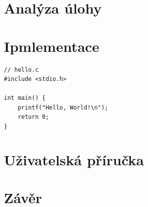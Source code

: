 \documentclass[12pt, a4paper]{article}
\begin{document}
\section{Analýza úlohy}


\section{Ipmlementace}

\begin{lstlisting}
// hello.c
#include <stdio.h>

int main() {
    printf("Hello, World!\n");
    return 0;
}
\end{lstlisting}


\section{Uživatelská příručka}


\section{Závěr}
\end{document}
